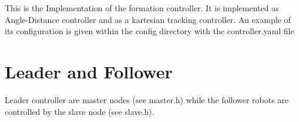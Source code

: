 This is the Implementation of the formation controller. It is implemented as Angle-\/\+Distance controller and as a kartesian tracking controller. An example of its configuration is given within the config directory with the controller.\+yaml file \section*{Leader and Follower}

Leader controller are master nodes (see master.\+h) while the follower robots are controlled by the slave node (see slave.\+h). 
